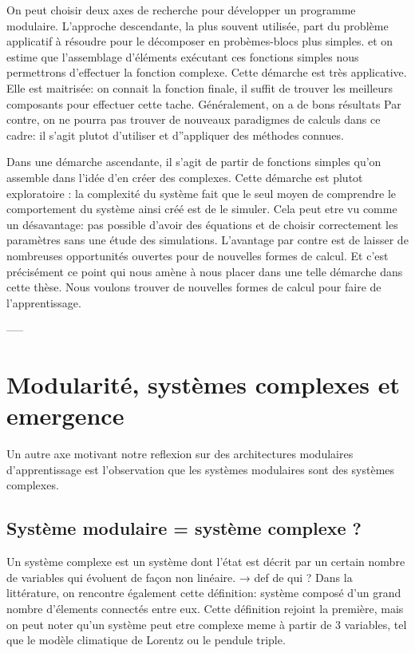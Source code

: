 \documentclass[../main]{subfiles}
\begin{document}
On peut choisir deux axes de recherche pour développer un programme modulaire.
 L'approche descendante, la plus souvent utilisée, part du problème applicatif à résoudre pour le décomposer en probèmes-blocs plus simples.  et on estime que l'assemblage d'éléments exécutant ces fonctions simples nous permettrons d'effectuer la fonction complexe.
Cette démarche est très applicative. Elle est maitrisée: on connait la fonction finale, il suffit de trouver les meilleurs composants pour effectuer cette tache. Généralement, on a de bons résultats
Par contre, on ne pourra pas trouver de nouveaux paradigmes de calculs dans ce cadre: il s’agit plutot d’utiliser et d”appliquer des méthodes connues. 

Dans une démarche ascendante, il s’agit de partir de fonctions simples qu’on assemble dans l’idée d’en créer des complexes. Cette démarche est plutot exploratoire : la complexité du système fait que le seul moyen de comprendre le comportement du système ainsi créé est de le simuler. Cela peut etre vu comme un désavantage: pas possible d’avoir des équations et de choisir correctement les paramètres sans une étude des simulations. L’avantage par contre est de laisser de nombreuses opportunités ouvertes pour de nouvelles formes de calcul.
Et c’est précisément ce point qui nous amène à nous placer dans une telle démarche dans cette thèse. Nous voulons trouver de nouvelles formes de calcul pour faire de l’apprentissage. 

-----

\section*{ Modularité, systèmes complexes et emergence}

Un autre axe motivant notre reflexion sur des architectures modulaires d’apprentissage est l’observation que les systèmes modulaires sont des systèmes complexes. 

\subsection*{Système modulaire = système complexe ? }

Un système complexe est un système dont l'état est décrit par un certain nombre de variables qui évoluent de façon non linéaire. → def de qui ?
Dans la littérature, on rencontre également cette définition: système composé d'un grand nombre d'élements connectés entre eux. Cette définition rejoint la première, mais on peut noter qu'un système peut etre complexe meme à partir de 3 variables, tel que le modèle climatique de Lorentz ou le pendule triple.
 
\end{document}
